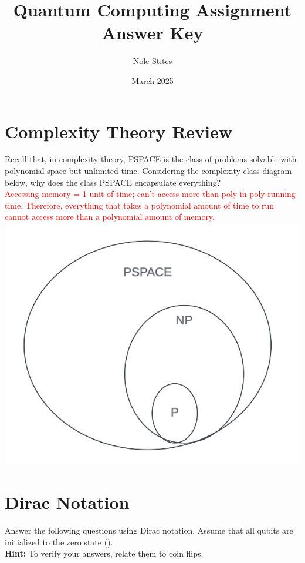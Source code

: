 \documentclass[12pt]{article}
\title{Quantum Computing Assignment \textbf{Answer Key}}
\author{Nole Stites}
\date{March 2025}
\begin{document}
\maketitle

\section{Complexity Theory Review}
Recall that, in complexity theory, PSPACE is the class of problems solvable with polynomial space but unlimited time. Considering the complexity class diagram below, why does the class PSPACE encapsulate everything? \\

\textcolor{red}{
Accessing memory = 1 unit of time; can't access more than poly in poly-running time. Therefore, everything that takes a polynomial amount of time to run cannot access more than a polynomial amount of memory.
}
\includegraphics[]{p_np_pspace_diagram.png}

\section{Dirac Notation}
Answer the following questions using Dirac notation. Assume that all qubits are initialized to the zero state (). \\
\textbf{Hint:} To verify your answers, relate them to coin flips.
\end{document}
